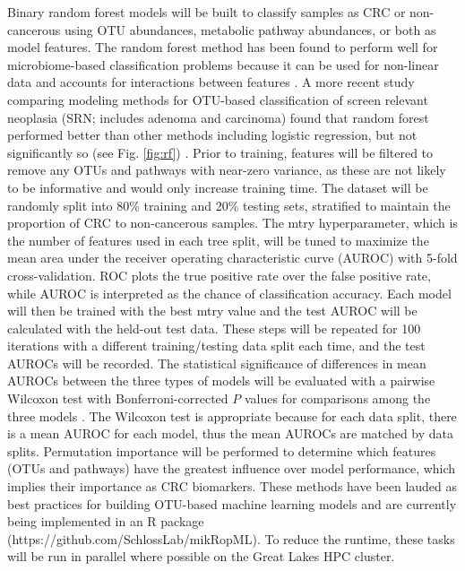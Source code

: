 \documentclass[11pt]{article}
\begin{document}
Binary random forest models will be built to classify samples as CRC or non-cancerous using OTU abundances, metabolic pathway abundances, or both as model features.
The random forest method has been found to perform well for microbiome-based classification problems because it can be used for non-linear data and accounts for interactions between features \cite{baxter_microbiota-based_2016}.
A more recent study comparing modeling methods for OTU-based classification of screen relevant neoplasia (SRN; includes adenoma and carcinoma) found that random forest performed better than other methods including logistic regression, but not significantly so (see Fig. \ref{fig:rf}) \cite{topcuoglu_framework_2020}.
Prior to training, features will be filtered to remove any OTUs and pathways with near-zero variance, as these are not likely to be informative and would only increase training time.
The dataset will be randomly split into 80\% training and 20\% testing sets, stratified to maintain the proportion of CRC to non-cancerous samples.
The mtry hyperparameter, which is the number of features used in each tree split, will be tuned to maximize the mean area under the receiver operating characteristic curve (AUROC) with 5-fold cross-validation.
ROC plots the true positive rate over the false positive rate, while AUROC is interpreted as the chance of classification accuracy.
Each model will then be trained with the best mtry value and the test AUROC will be calculated with the held-out test data.
These steps will be repeated for 100 iterations with a different training/testing data split each time, and the test AUROCs will be recorded.
The statistical significance of differences in mean AUROCs between the three types of models will be evaluated with a pairwise Wilcoxon test with Bonferroni-corrected $P$ values for comparisons among the three models \cite{hannigan_diagnostic_2018}.
The Wilcoxon test is appropriate because for each data split, there is a mean AUROC for each model, thus the mean AUROCs are matched by data splits.
Permutation importance will be performed to determine which features (OTUs and pathways) have the greatest influence over model performance, which implies their importance as CRC biomarkers.
These methods have been lauded as best practices for building OTU-based machine learning models \cite{topcuoglu_framework_2020} and are currently being implemented in an R package (https://github.com/SchlossLab/mikRopML).
To reduce the runtime, these tasks will be run in parallel where possible on the Great Lakes HPC cluster.
\end{document}
